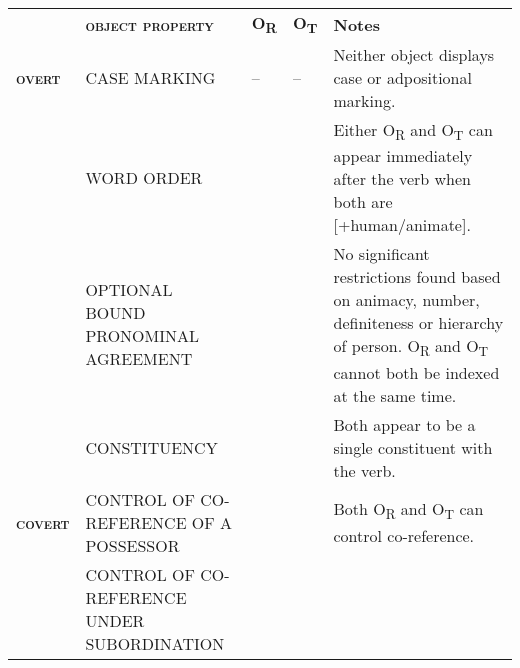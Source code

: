\documentclass[output=paper]{langsci/langscibook}
\begin{document}
{{{{{{{\begin{tabular}{lllll} & \textbf{\textsc{object property}} & \textbf{O}\textbf{\textsubscript{R}} & \textbf{O}\textbf{\textsubscript{T}} & \textbf{Notes}\\
\lsptoprule
{ \textbf{\textsc{overt}}} & CASE MARKING & – & – & Neither object displays case or adpositional marking.\\
& WORD ORDER & 
\end{itemize} & 
\end{itemize} & Either O\textsubscript{R} and O\textsubscript{T} can appear immediately after the verb when both are [+human/animate]. \\
\hhline{~----} & OPTIONAL BOUND PRONOMINAL AGREEMENT & 
\end{itemize} & 
\end{itemize} & No significant restrictions found based on animacy, number, definiteness or hierarchy of person. O\textsubscript{R} and O\textsubscript{T} cannot both be indexed at the same time.\\
\hhline{~----} & CONSTITUENCY & 
\end{itemize} & 
\end{itemize} & Both appear to be a single constituent with the verb.\\
{ \textbf{\textsc{covert}}} & CONTROL OF CO-REFERENCE OF A POSSESSOR & 
\end{itemize} & 
\end{itemize} & Both O\textsubscript{R }and O\textsubscript{T} can control co-reference.\\
& CONTROL OF CO-REFERENCE UNDER SUBORDINATION & 

\end{tabular}}}}}}}}
\end{document}
